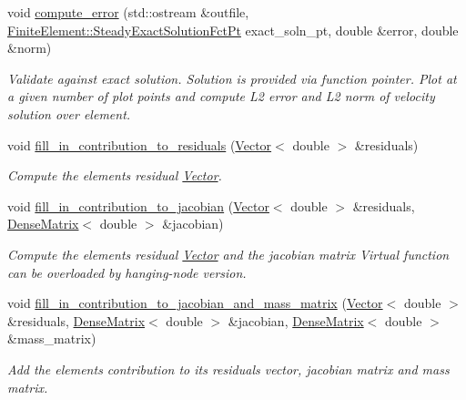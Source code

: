 \begin{DoxyCompactItemize}
void \hyperlink{classoomph_1_1GeneralisedNewtonianNavierStokesEquations_af8aac75c7792345dbdd9ca02de0bee0b}{compute\+\_\+error} (std\+::ostream \&outfile, \hyperlink{classoomph_1_1FiniteElement_a690fd33af26cc3e84f39bba6d5a85202}{Finite\+Element\+::\+Steady\+Exact\+Solution\+Fct\+Pt} exact\+\_\+soln\+\_\+pt, double \&error, double \&norm)
\begin{DoxyCompactList}\small\item\em Validate against exact solution. Solution is provided via function pointer. Plot at a given number of plot points and compute L2 error and L2 norm of velocity solution over element. \end{DoxyCompactList}\item 
void \hyperlink{classoomph_1_1GeneralisedNewtonianNavierStokesEquations_a6caf76fe70722b03b4826aa4b1dd6612}{fill\+\_\+in\+\_\+contribution\+\_\+to\+\_\+residuals} (\hyperlink{classoomph_1_1Vector}{Vector}$<$ double $>$ \&residuals)
\begin{DoxyCompactList}\small\item\em Compute the element\textquotesingle{}s residual \hyperlink{classoomph_1_1Vector}{Vector}. \end{DoxyCompactList}\item 
void \hyperlink{classoomph_1_1GeneralisedNewtonianNavierStokesEquations_a384bfd4f4b9b88af8f8a2eb100b2f6bb}{fill\+\_\+in\+\_\+contribution\+\_\+to\+\_\+jacobian} (\hyperlink{classoomph_1_1Vector}{Vector}$<$ double $>$ \&residuals, \hyperlink{classoomph_1_1DenseMatrix}{Dense\+Matrix}$<$ double $>$ \&jacobian)
\begin{DoxyCompactList}\small\item\em Compute the element\textquotesingle{}s residual \hyperlink{classoomph_1_1Vector}{Vector} and the jacobian matrix Virtual function can be overloaded by hanging-\/node version. \end{DoxyCompactList}\item 
void \hyperlink{classoomph_1_1GeneralisedNewtonianNavierStokesEquations_a0fcfa12094978020507c8d4aa2a9669f}{fill\+\_\+in\+\_\+contribution\+\_\+to\+\_\+jacobian\+\_\+and\+\_\+mass\+\_\+matrix} (\hyperlink{classoomph_1_1Vector}{Vector}$<$ double $>$ \&residuals, \hyperlink{classoomph_1_1DenseMatrix}{Dense\+Matrix}$<$ double $>$ \&jacobian, \hyperlink{classoomph_1_1DenseMatrix}{Dense\+Matrix}$<$ double $>$ \&mass\+\_\+matrix)
\begin{DoxyCompactList}\small\item\em Add the element\textquotesingle{}s contribution to its residuals vector, jacobian matrix and mass matrix. \end{DoxyCompactList}\item 

\end{DoxyCompactItemize}
